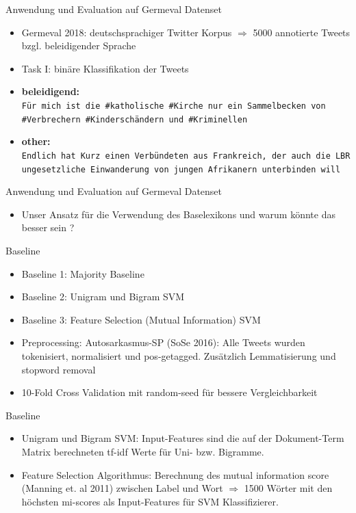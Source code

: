 \documentclass{beamer}
\begin{document}
\begin{frame}[fragile]{Anwendung und Evaluation auf Germeval Datenset}
\begin{itemize}
\item Germeval 2018: deutschsprachiger Twitter Korpus $\Rightarrow$ 5000 annotierte Tweets bzgl. beleidigender Sprache
\item Task I: binäre Klassifikation der Tweets
\item \textbf{beleidigend:} \\ \footnotesize \texttt{Für mich ist die \#katholische \#Kirche nur ein Sammelbecken von \#Verbrechern \#Kinderschändern und \#Kriminellen}
\item \normalsize \textbf{other:} \\ \footnotesize \texttt{Endlich hat Kurz einen Verbündeten aus Frankreich, der auch die LBR ungesetzliche Einwanderung von jungen Afrikanern unterbinden will}
\end{itemize}
\end{frame}

\begin{frame}[fragile]{Anwendung und Evaluation auf Germeval Datenset}
\begin{itemize}
\item Unser Ansatz für die Verwendung des Baselexikons und warum könnte das besser sein ?
\end{itemize}
\end{frame}

\begin{frame}{Baseline}
\begin{itemize}
\item Baseline 1: Majority Baseline
\item Baseline 2: Unigram und Bigram SVM
\item Baseline 3: Feature Selection (Mutual Information) SVM 
\item Preprocessing: Autosarkasmus-SP (SoSe 2016): Alle Tweets wurden tokenisiert, normalisiert und pos-getagged. Zusätzlich Lemmatisierung und stopword removal
\item 10-Fold Cross Validation mit random-seed für bessere Vergleichbarkeit
\end{itemize}
\end{frame}

\begin{frame}{Baseline}
\begin{itemize}
\item Unigram und Bigram SVM: Input-Features sind die auf der Dokument-Term Matrix berechneten tf-idf Werte für Uni- bzw. Bigramme.    
\item Feature Selection Algorithmus: Berechnung des mutual information score (Manning et. al 2011) zwischen Label und Wort $\Rightarrow$ 1500 Wörter mit den höchsten mi-scores als Input-Features für SVM Klassifizierer. 
\end{itemize}
\end{frame}
\end{document}
